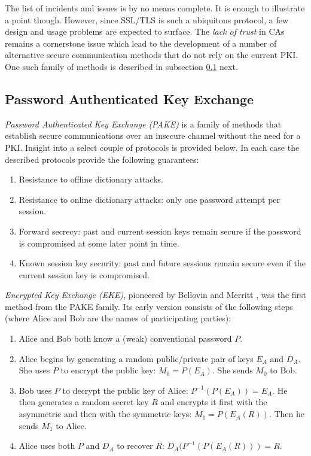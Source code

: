 The list of incidents and issues is by no means complete. It is enough to illustrate a point though. However, since SSL/TLS is such a ubiquitous protocol, a few design and usage problems are expected to surface. The \emph{lack of trust} in CAs remains a cornerstone issue which lead to the development of a number of alternative secure communication methods that do not rely on the current PKI. One such family of methods is described in subsection \ref{subsec:pake} next.

\subsection{Password Authenticated Key Exchange}
\label{subsec:pake}

\emph{Password Authenticated Key Exchange (PAKE)} is a family of methods that establish secure communications over an insecure channel without the need for a PKI. Insight into a select couple of protocols is provided below. In each case the described protocols provide the following guarantees:

\begin{enumerate}
    \item Resistance to offline dictionary attacks.
    \item Resistance to online dictionary attacks: only one password attempt per session.
    \item Forward secrecy: past and current session keys remain secure if the password is compromised at some later point in time.
    \item Known session key security: past and future sessions remain secure even if the current session key is compromised.
  \end{enumerate}

\emph{Encrypted Key Exchange (EKE)}, pioneered by Bellovin and Merritt \cite{bellovin1992encrypted, bellovin1993augmented}, was the first method from the PAKE family. Its early version consists of the following steps (where Alice and Bob are the names of participating parties):

\begin{enumerate}
    \item Alice and Bob both know a (weak) conventional password \(P\).
    \item Alice begins by generating a random public/private pair of keys \(E_A\) and \(D_A\). She uses \(P\) to encrypt the public key: \(M_0 = P(E_A)\). She sends \(M_0\) to Bob.
    \item Bob uses \(P\) to decrypt the public key of Alice: \(P^{-1}(P(E_A)) = E_A\). He then generates a random secret key \(R\) and encrypts it first with the asymmetric and then with the symmetric keys: \(M_1 = P(E_A(R))\). Then he sends \(M_1\) to Alice.
    \item Alice uses both \(P\) and \(D_A\) to recover \(R\): \(D_A(P^{-1}(P(E_A(R))) = R\).
  \end{enumerate}

